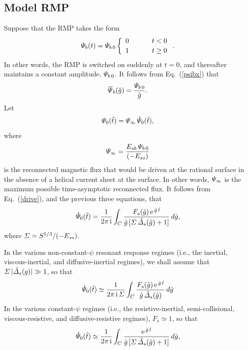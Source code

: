\documentclass[12pt,prb,aps]{revtex4-1}
\begin{document}
\subsection{Model RMP}
Suppose that the RMP takes the form 
\begin{equation}\label{e145}
{\mit\Psi}_b(t) = {\mit\Psi}_{b\,0}\left\{\begin{array}{ccc} 0&~~~~&t<0\\[0.5ex]
1&&t\geq 0\end{array}\right..
\end{equation}
In other words, the RMP is switched on suddenly at $t=0$, and thereafter maintains a constant amplitude, ${\mit\Psi}_{b\,0}$. It follows from Eq.~(\ref{psibx}) that
\begin{equation}
\overline{\mit\Psi}_b(\hat{g}) = \frac{{\mit\Psi}_{b\,0}}{\hat{g}}.
\end{equation}
Let
\begin{equation}
{\mit\Psi}_0(\hat{t}) = {\mit\Psi}_\infty\,\hat{\mit\Psi}_0(\hat{t}),
\end{equation}
where
\begin{equation}
{\mit\Psi}_\infty = \frac{E_{sb}\,{\mit\Psi}_{b\,0}}{(-E_{ss})}
\end{equation}
is the reconnected magnetic flux that would be driven at the rational surface in the absence of a helical current sheet at the surface. In other words, ${\mit\Psi}_\infty$ is the maximum possible
time-asymptotic reconnected flux. It follows from Eq.~(\ref{drive}), and the previous three equations,  that
\begin{equation}\label{e29}
\hat{\mit\Psi}_0(\hat{t}) = \frac{1}{2\pi\,{\rm i}}\int_C \frac{F_s(\hat{g})\,{\rm e}^{\,\hat{g}\,\hat{t}}}{\hat{g}\,[{\mit\Sigma}\,\hat{\mit\Delta}_s(\hat{g})+1]}\,d\hat{g},
\end{equation}
where ${\mit\Sigma}= S^{1/3}/(-E_{ss})$. 

In the various non-constant-$\psi$ resonant response regimes (i.e., the inertial, viscous-inertial, and diffusive-inertial regimes), we shall assume that ${\mit\Sigma}\,|\hat{\mit\Delta}_s(g)|\gg 1$, so that 
\begin{equation}\label{ncp}
\hat{\mit\Psi}_0(\hat{t}) \simeq \frac{1}{2\pi\,{\rm i}\,{\mit\Sigma}}\int_C \frac{F_s(\hat{g})\,{\rm e}^{\,\hat{g}\,\hat{t}}}{\hat{g}\,\hat{\mit\Delta}_s(\hat{g})}\,d\hat{g}
\end{equation}
In the various constant-$\psi$ regimes  (i.e., the resistive-inertial, semi-collisional, viscous-resistive, and diffusive-resistive regimes), $F_s\simeq 1$, so that 
\begin{equation}\label{cp}
\hat{\mit\Psi}_0(\hat{t}) \simeq \frac{1}{2\pi\,{\rm i}}\int_C \frac{{\rm e}^{\,\hat{g}\,\hat{t}}}{\hat{g}\,[{\mit\Sigma}\,\hat{\mit\Delta}_s(\hat{g})+1]}\,d\hat{g},
\end{equation}
\end{document}

